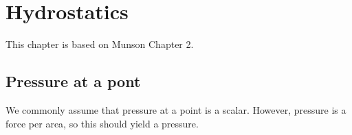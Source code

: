 \chapter{Hydrostatics}
This chapter is based on Munson Chapter 2.


\section{Pressure at a pont}
We commonly assume that pressure at a point is a scalar. However, pressure is a force per area, so this should yield a pressure.
